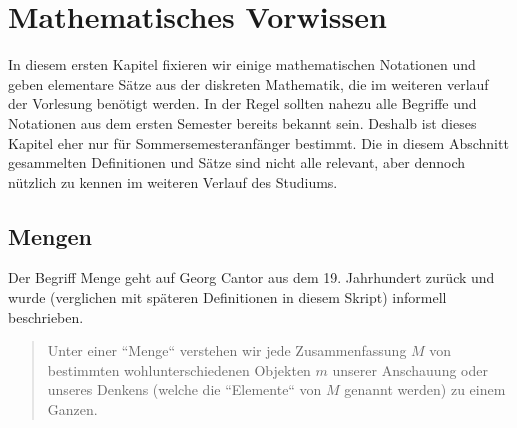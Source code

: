 \documentclass[11pt, a4paper]{article}
\theoremstyle{definition}
\theoremstyle{plain}
\numberwithin{equation}{section}
\begin{document}
\newpage
\tableofcontents


\newpage
\pagestyle{headings}
\section{Mathematisches Vorwissen}\label{sec:pre}
In diesem ersten Kapitel fixieren wir einige mathematischen Notationen und geben elementare Sätze aus der diskreten Mathematik, die im weiteren verlauf der Vorlesung benötigt werden. In der Regel sollten nahezu alle Begriffe und Notationen aus dem ersten Semester bereits bekannt sein. Deshalb ist dieses Kapitel eher nur für Sommersemesteranfänger bestimmt. Die in diesem Abschnitt gesammelten Definitionen und Sätze sind nicht alle relevant, aber dennoch nützlich zu kennen im weiteren Verlauf des Studiums.


\subsection{Mengen}\label{sec:pre_sets}
Der Begriff Menge geht auf Georg Cantor aus dem 19. Jahrhundert zurück und wurde (verglichen mit späteren Definitionen in diesem Skript) informell beschrieben.
\begin{quote}
	Unter einer ``Menge`` verstehen wir jede Zusammenfassung $M$ von bestimmten wohlunterschiedenen Objekten $m$ unserer Anschauung oder unseres Denkens (welche die ``Elemente`` von $M$ genannt werden) zu einem Ganzen.
\end{quote}
\end{document}
